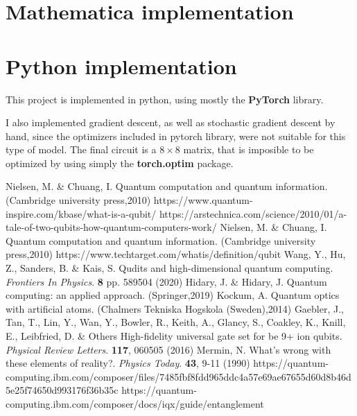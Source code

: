 \documentclass[inscr,ack,preface]{diphdthesis}
\begin{document}
\section{Mathematica implementation}
\section{Python implementation}

This project is implemented in python, using mostly the \textbf{PyTorch} library. 


I also implemented gradient descent, as well as stochastic gradient descent by hand, since the optimizers included in pytorch library, were not suitable for this type of model. The final circuit is a $8\times8$ matrix, that is imposible to be optimized by using simply the \textbf{torch.optim} package.\\






\begin{thebibliography}{99}                                                                     
Nielsen, M. \& Chuang, I. Quantum computation and quantum information. (Cambridge university press,2010)
https://www.quantum-inspire.com/kbase/what-is-a-qubit/
https://arstechnica.com/science/2010/01/a-tale-of-two-qubits-how-quantum-computers-work/
Nielsen, M. \& Chuang, I. Quantum computation and quantum information. (Cambridge university press,2010)
https://www.techtarget.com/whatis/definition/qubit
Wang, Y., Hu, Z., Sanders, B. \& Kais, S. Qudits and high-dimensional quantum computing. {\em Frontiers In Physics}. \textbf{8} pp. 589504 (2020)
Hidary, J. \& Hidary, J. Quantum computing: an applied approach. (Springer,2019)
Kockum, A. Quantum optics with artificial atoms. (Chalmers Tekniska Hogskola (Sweden),2014)
Gaebler, J., Tan, T., Lin, Y., Wan, Y., Bowler, R., Keith, A., Glancy, S., Coakley, K., Knill, E., Leibfried, D. \& Others High-fidelity universal gate set for be 9+ ion qubits. {\em Physical Review Letters}. \textbf{117}, 060505 (2016)
Mermin, N. What's wrong with these elements of reality?. {\em Physics Today}. \textbf{43}, 9-11 (1990)
https://quantum-computing.ibm.com/composer/files/7485fbf8fdd965ddc4a57e69ae67655d60d8b46d5e25f74650d993176f36b35c
https://quantum-computing.ibm.com/composer/docs/iqx/guide/entanglement


\end{thebibliography}
\end{document}
